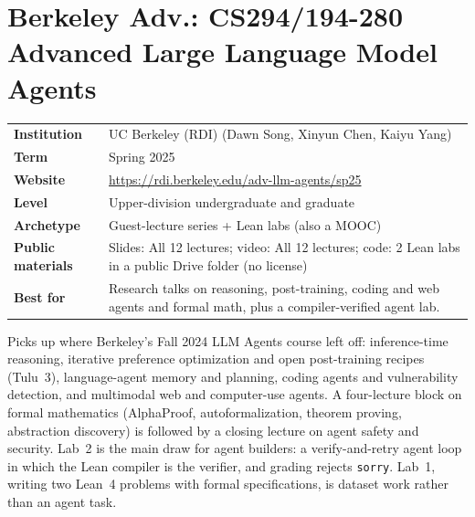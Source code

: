 \documentclass[10pt,oneside]{report}
\begin{document}
\chapter{Berkeley Adv.: CS294/194-280 Advanced Large Language Model Agents}\hypertarget{course-BRKADV}{}
{\small\begin{tabularx}{\linewidth}{@{}>{\bfseries}l X@{}}\toprule
Institution & UC Berkeley (RDI) (Dawn Song, Xinyun Chen, Kaiyu Yang)\\
Term & Spring 2025\\
Website & \href{https://rdi.berkeley.edu/adv-llm-agents/sp25}{https://rdi.berkeley.edu/adv-llm-agents/sp25}\\
Level & Upper-division undergraduate and graduate\\
Archetype & Guest-lecture series + Lean labs (also a MOOC)\\
Public materials & Slides: All 12 lectures; video: All 12 lectures; code: 2 Lean labs in a public Drive folder (no license)\\
Best for & Research talks on reasoning, post-training, coding and web agents and formal math, plus a compiler-verified agent lab.\\
\bottomrule\end{tabularx}}

Picks up where Berkeley's Fall 2024 LLM Agents course left off: inference-time reasoning, iterative preference optimization and open post-training recipes (Tulu~3), language-agent memory and planning, coding agents and vulnerability detection, and multimodal web and computer-use agents.
A four-lecture block on formal mathematics (AlphaProof, autoformalization, theorem proving, abstraction discovery) is followed by a closing lecture on agent safety and security.
Lab~2 is the main draw for agent builders: a verify-and-retry agent loop in which the Lean compiler is the verifier, and grading rejects \texttt{sorry}. Lab~1, writing two Lean~4 problems with formal specifications, is dataset work rather than an agent task.
\end{document}
